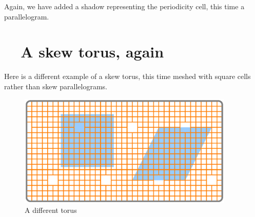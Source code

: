 Again, we have added a shadow representing the periodicity cell, this time a parallelogram.


\section{~~A skew torus, again}\label{\numb section 7.\numb parag 8}

Here is a different example of a skew torus, this time meshed with square cells
rather than skew parallelograms.

\begin{figure}[ht] \centering
  \includegraphics[width=103mm]{flat-torus-4.eps}
  \caption{A different torus}
  \label{\numb section 7.\numb fig 4}
\end{figure}

